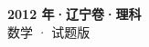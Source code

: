 \documentclass[zihao=-4, a4paper]{ctexart}
\begin{document}
\begin{center}
  {\Large\bfseries 2012 年·辽宁卷·理科}\\[4pt]
  {\large 数学 · 试题版}
\end{center}
\medskip
{}

\end{document}
